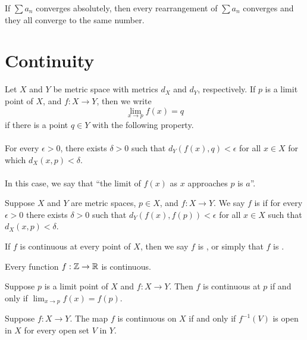 \documentclass{mathnotes}
\begin{document}
\begin{prop}
  If $\sum a_n$ converges absolutely, then every rearrangement of $\sum a_n$
  converges and they all converge to the same number.
\end{prop}

\section*{Continuity}

\begin{bdefi}
  Let $X$ and $Y$ be metric space with metrics $d_X$ and $d_Y$, respectively.
  If $p$ is a limit point of $X$, and $f:X\to Y$, then we write
  $$\lim_{x\to p}f(x)=q$$
  if there is a point $q\in Y$ with the following property.\\\\
  For every $\epsilon>0$, there exists $\delta>0$ such that
  $d_Y(f(x),q)<\epsilon$ for all $x\in X$ for which $d_X(x,p)<\delta$.\\\\
  In this case, we say that ``the limit of $f(x)$ as $x$ approaches $p$ is
  $a$''.
\end{bdefi}

\begin{bdefi}
  Suppose $X$ and $Y$ are metric spaces, $p\in X$, and $f:X\to Y$. We say $f$
  is  if for every $\epsilon>0$ there exists
  $\delta>0$ such that $d_Y(f(x),f(p))<\epsilon$ for all $x\in X$ such that
  $d_X(x,p)<\delta$.
\end{bdefi}

\begin{bdefi}
  If $f$ is continuous at every point of $X$, then we say $f$ is
  , or simply that $f$ is .
\end{bdefi}

\begin{ex}
  Every function $f:\mathbb{Z}\to\mathbb{R}$ is continuous.
\end{ex}

\begin{thm}
  Suppose $p$ is a limit point of $X$ and $f:X\to Y$. Then $f$ is continuous at
  $p$ if and only if $\lim_{x\to p}f(x)=f(p)$.
\end{thm}

\begin{thm}
  Suppose $f:X\to Y$. The map $f$ is continuous on $X$ if and only if
  $f^{-1}(V)$ is open in $X$ for every open set $V$ in $Y$.
\end{thm}
\end{document}
